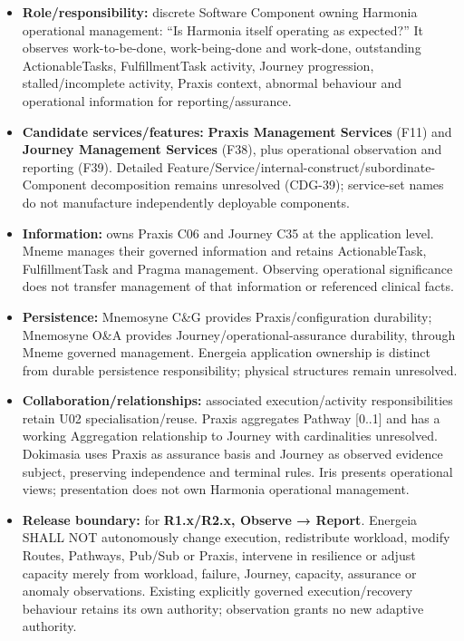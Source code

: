 \begin{itemize}


\item \textbf{Role/responsibility:} discrete Software Component owning Harmonia operational
  management: “Is Harmonia itself operating as expected?” It observes work-to-be-done,
  work-being-done and work-done, outstanding ActionableTasks, FulfillmentTask
  activity, Journey progression, stalled/incomplete activity, Praxis context,
  abnormal behaviour and operational information for reporting/assurance.

\item \textbf{Candidate services/features:} \textbf{Praxis Management Services} (F11) and
  \textbf{Journey Management Services} (F38), plus operational observation
  and reporting (F39). Detailed Feature/Service/internal-construct/subordinate-
  Component decomposition remains unresolved (CDG-39); service-set names do not
  manufacture independently deployable components.

\item \textbf{Information:} owns Praxis C06 and Journey C35 at the application level.
  Mneme manages their governed information and retains ActionableTask,
  FulfillmentTask and Pragma management. Observing operational significance does
  not transfer management of that information or referenced clinical facts.

\item \textbf{Persistence:} Mnemosyne C\&G provides Praxis/configuration durability;
  Mnemosyne O\&A provides Journey/operational-assurance durability, through Mneme
  governed management. Energeia application ownership is distinct from durable
  persistence responsibility; physical structures remain unresolved.

\item \textbf{Collaboration/relationships:} associated execution/activity responsibilities
  retain U02 specialisation/reuse. Praxis aggregates Pathway [0..1] and has a
  working Aggregation relationship to Journey with cardinalities unresolved.
  Dokimasia uses Praxis as assurance basis and Journey as observed evidence
  subject, preserving independence and terminal rules. Iris presents operational
  views; presentation does not own Harmonia operational management.

\item \textbf{Release boundary:} for \textbf{R1.x/R2.x, Observe → Report}. Energeia
  SHALL NOT autonomously change execution, redistribute workload, modify Routes,
  Pathways, Pub/Sub or Praxis, intervene in resilience or adjust capacity merely
  from workload, failure, Journey, capacity, assurance or anomaly observations.
  Existing explicitly governed execution/recovery behaviour retains its own
  authority; observation grants no new adaptive authority.


\end{itemize}
